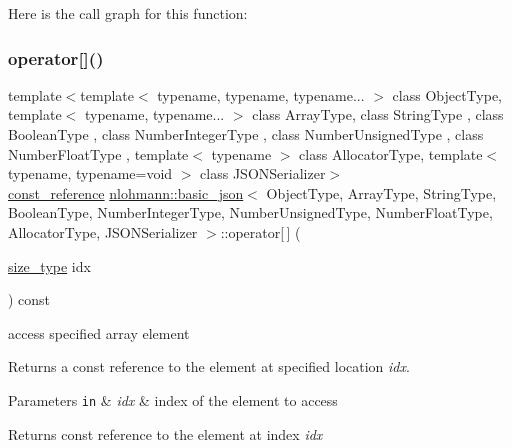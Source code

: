 Here is the call graph for this function\+:
\mbox{\label{classnlohmann_1_1basic__json_a9cb592cd85c14f3e845e30d51cf17efb}} 
\subsubsection{\texorpdfstring{operator[]()}{operator[]()}\hspace{0.1cm}{\footnotesize\ttfamily [2/8]}}
{\footnotesize\ttfamily template$<$template$<$ typename, typename, typename... $>$ class Object\+Type, template$<$ typename, typename... $>$ class Array\+Type, class String\+Type , class Boolean\+Type , class Number\+Integer\+Type , class Number\+Unsigned\+Type , class Number\+Float\+Type , template$<$ typename $>$ class Allocator\+Type, template$<$ typename, typename=void $>$ class J\+S\+O\+N\+Serializer$>$ \\
\hyperlink{classnlohmann_1_1basic__json_a4057c5425f4faacfe39a8046871786ca}{const\+\_\+reference} \hyperlink{classnlohmann_1_1basic__json}{nlohmann\+::basic\+\_\+json}$<$ Object\+Type, Array\+Type, String\+Type, Boolean\+Type, Number\+Integer\+Type, Number\+Unsigned\+Type, Number\+Float\+Type, Allocator\+Type, J\+S\+O\+N\+Serializer $>$\+::operator\mbox{[}$\,$\mbox{]} (\begin{DoxyParamCaption}\item[{\hyperlink{classnlohmann_1_1basic__json_a39f2cd0b58106097e0e67bf185cc519b}{size\+\_\+type}}]{idx }\end{DoxyParamCaption}) const\hspace{0.3cm}{\ttfamily [inline]}}



access specified array element 

Returns a const reference to the element at specified location {\itshape idx}.


\begin{DoxyParams}[1]{Parameters}
\mbox{\tt in}  & {\em idx} & index of the element to access\\
\hline
\end{DoxyParams}
\begin{DoxyReturn}{Returns}
const reference to the element at index {\itshape idx} 
\end{DoxyReturn}

